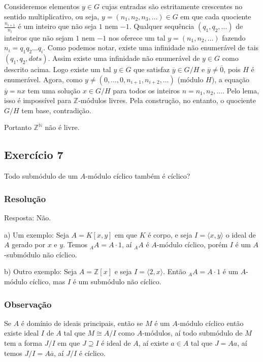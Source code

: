 \documentclass[10pt,a4paper]{article}
\begin{document}
\medskip
\noindent
Consideremos elementos $y\in G$ cujas entradas são estritamente crescentes no sentido multiplicativo, ou seja, $y=(n_1,n_2,n_3,\dots)\in G$ em que cada quociente $\frac{n_{i+1}}{n_i}$ é um inteiro que não seja $1$ nem $-1$. Qualquer sequência $(q_1,q_2,\dots)$ de inteiros que não sejam $1$ nem $-1$ nos oferece um tal $y=(n_1,n_2,\dots)$ fazendo $n_i=q_1q_2\dots q_i$. Como podemos notar, existe uma infinidade não enumerável de tais $(q_1,q_2,dots)$. Assim existe uma infinidade não enumerável de $y\in G$ como descrito acima. Logo existe um tal $y\in G$ que satisfaz $\overline{y}\in G/H$ e $\overline{y}\neq\overline{0}$, pois $H$ é enumerável. Agora, como $y\neq(0,\dots,0,n_{i+1},n_{i+2},\dots)$ (módulo $H$), a equação $\overline{y}=nx$ tem uma solução $x\in G/H$ para todos os inteiros $n=n_1,n_2,\dots$. Pelo lema, isso é impossível para $\mathbb{Z}$-módulos livres. Pela construção, no entanto, o quociente $G/H$ tem base, contradição.

\medskip
\noindent
Portanto $\mathbb{Z}^\mathbb{N}$ não é livre.

\subsection*{Exercício 7}

Todo submódulo de um $A$-módulo cíclico também é cíclico?

\subsubsection*{Resolução}

Resposta: Não.

\medskip
\noindent
a) Um exemplo: Seja $A=K[x,y]$ em que $K$ é corpo, e seja $I=\langle x,y\rangle$ o ideal de $A$ gerado por $x$ e $y$. Temos $_AA=A\cdot1$, aí $_AA$ é $A$-módulo cíclico, porém $I$ é um $A$-submódulo não cíclico.

\medskip
\noindent
b) Outro exemplo: Seja $A=\mathbb{Z}[x]$ e seja $I=\langle 2,x\rangle$. Então $_AA=A\cdot1$ é um $A$-módulo cíclico, mas $I$ é um submódulo não cíclico.

\subsubsection*{Observação}

Se $A$ é domínio de ideais principais, então se $M$ é um $A$-módulo cíclico então existe ideal $I$ de $A$ tal que $M\cong A/I$ como $A$-módulos, aí todo submódulo de $M$ tem a forma $J/I$ em que $J\supseteq I$ é ideal de $A$, aí existe $a\in A$ tal que $J=Aa$, aí temos $J/I=A\overline{a}$, aí $J/I$ é cíclico.
\end{document}
